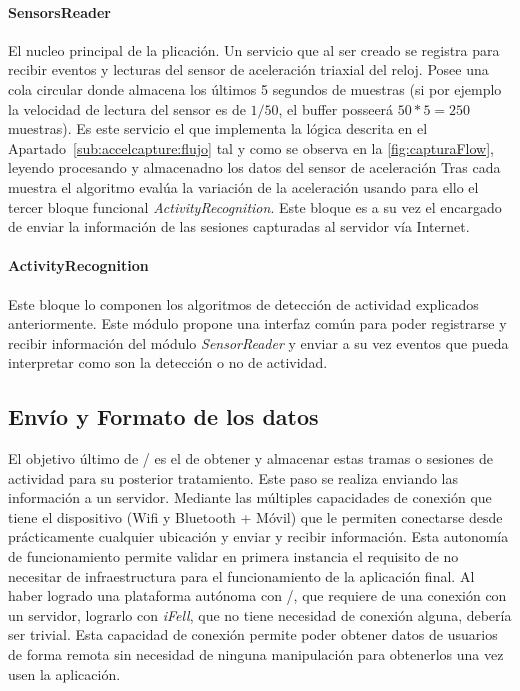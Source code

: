 \paragraph{SensorsReader}
El nucleo principal de la plicación. Un servicio que al ser creado se registra para recibir eventos y lecturas del sensor de aceleración triaxial del reloj. Posee una cola circular donde almacena los últimos 5 segundos de muestras (si por ejemplo la velocidad de lectura del sensor es de $1/50$, el buffer posseerá $50 * 5 = 250$ muestras).
Es este servicio el que implementa la lógica descrita en el Apartado~\ref{sub:accelcapture:flujo} tal y como se observa en la \autoref{fig:capturaFlow}, leyendo procesando y almacenadno los datos del sensor de aceleración  Tras cada muestra el algoritmo evalúa la variación de la aceleración usando para ello el tercer bloque funcional \textit{ActivityRecognition}. Este bloque es a su vez el encargado de enviar la información de las sesiones capturadas al servidor vía Internet.

\paragraph{ActivityRecognition}
Este bloque lo componen los algoritmos de detección de actividad explicados anteriormente. Este módulo propone una interfaz común para poder registrarse y recibir información del módulo \textit{SensorReader} y enviar a su vez eventos que pueda interpretar como son la detección o no de actividad.


\subsection{Envío y Formato de los datos}\label{sub:accelcapture:red}

El objetivo último de \accelcapture/ es el de obtener y almacenar estas tramas o sesiones de actividad para su posterior tratamiento. Este paso se realiza enviando las información a un servidor. Mediante las múltiples capacidades de conexión que tiene el dispositivo (Wifi y Bluetooth + Móvil) que le permiten conectarse desde prácticamente cualquier ubicación y enviar y recibir información. Esta autonomía de funcionamiento permite validar en primera instancia el requisito de no necesitar de infraestructura para el funcionamiento de la aplicación final. Al haber logrado una plataforma autónoma con \accelcapture/, que requiere de una conexión con un servidor, lograrlo con \textit{iFell}, que no tiene necesidad de conexión alguna, debería ser trivial. Esta capacidad de conexión permite poder obtener datos de usuarios de forma remota sin necesidad de ninguna manipulación para obtenerlos una vez usen la aplicación.

